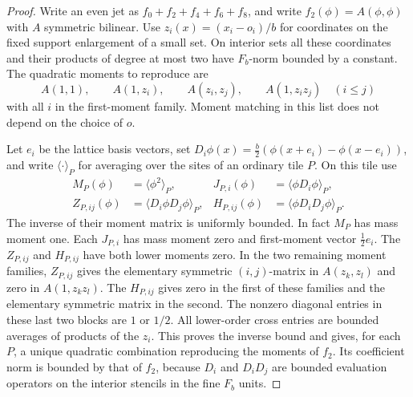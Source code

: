 \documentclass[11pt]{article}
\theoremstyle{definition}
\begin{document}
\begin{proof}
Write an even jet as \(f_0+f_2+f_4+f_6+f_8\), and write
\(f_2(\phi)=A(\phi,\phi)\) with \(A\) symmetric bilinear. Use
\(z_i(x)=(x_i-o_i)/b\) for coordinates on the fixed support
enlargement of a small set. On interior sets all these coordinates
and their products of degree at most two have \(F_b\)-norm bounded
by a constant. The quadratic moments to reproduce are
\begin{equation}
 A(1,1),\qquad A(1,z_i),\qquad
 A(z_i,z_j),\qquad A(1,z_i z_j)\quad (i\le j)
\end{equation}
with all \(i\) in the first-moment family. Moment matching in this
list does not depend on the choice of \(o\).

Let \(e_i\) be the lattice basis vectors, set
\(D_i\phi(x)=\tfrac b2(\phi(x+e_i)-\phi(x-e_i))\), and write
\(\langle\cdot\rangle_P\) for averaging over the sites of an
ordinary tile \(P\). On this tile use
\begin{equation}
 \begin{aligned}
 M_P(\phi)&=\langle\phi^2\rangle_P,&
 J_{P,i}(\phi)&=\langle \phi D_i\phi\rangle_P,\\
 Z_{P,ij}(\phi)&=\langle D_i\phi D_j\phi\rangle_P,&
 H_{P,ij}(\phi)&=\langle\phi D_iD_j\phi\rangle_P .
 \end{aligned}
\end{equation}
The inverse of their moment matrix is uniformly bounded. In
fact \(M_P\) has mass moment one. Each \(J_{P,i}\) has mass
moment zero and first-moment vector \(\tfrac12 e_i\). The
\(Z_{P,ij}\) and \(H_{P,ij}\) have both lower moments zero.
In the two remaining moment families, \(Z_{P,ij}\) gives the
elementary symmetric \((i,j)\)-matrix in \(A(z_k,z_l)\) and
zero in \(A(1,z_kz_l)\). The \(H_{P,ij}\) gives zero in the first
of these families and the elementary symmetric matrix in the
second. The nonzero diagonal entries in these last two blocks
are \(1\) or \(1/2\). All lower-order cross entries are bounded
averages of products of the \(z_i\). This proves the inverse
bound and gives, for each \(P\), a unique quadratic combination
reproducing the moments of \(f_2\). Its coefficient norm is
bounded by that of \(f_2\), because \(D_i\) and \(D_iD_j\)
are bounded evaluation operators on the interior stencils
in the fine \(F_b\) units.


\end{proof}
\end{document}
